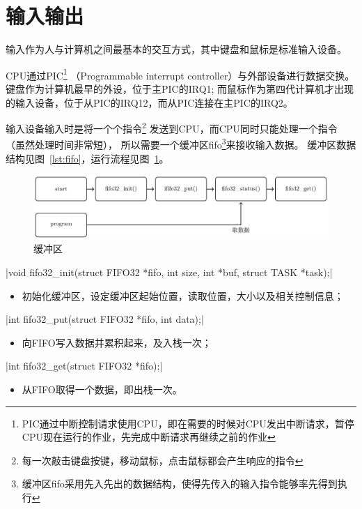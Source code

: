 \section{输入输出}
输入作为人与计算机之间最基本的交互方式，其中键盘和鼠标是标准输入设备。

CPU通过PIC\footnote{PIC通过中断控制请求使用CPU，即在需要的时候对CPU发出中断请求，暂停CPU现在运行的作业，先完成中断请求再继续之前的作业}
（Programmable interrupt controller）与外部设备进行数据交换。
键盘作为计算机最早的外设，位于主PIC的IRQ1;
而鼠标作为第四代计算机才出现的输入设备，位于从PIC的IRQ12，而从PIC连接在主PIC的IRQ2。

输入设备输入时是将一个个指令\footnote{每一次敲击键盘按键，移动鼠标，点击鼠标都会产生响应的指令}
发送到CPU，而CPU同时只能处理一个指令（虽然处理时间非常短），
所以需要一个缓冲区fifo\footnote{缓冲区fifo采用先入先出的数据结构，使得先传入的输入指令能够率先得到执行}来接收输入数据。
缓冲区数据结构见图~\ref{lst:fifo}，运行流程见图~\ref{fig:fifo}。

\begin{figure}[H]
    \centering
    \includegraphics[width=\textwidth]{../Fig/func/fifo.pdf}
    \caption{缓冲区}
    \label{fig:fifo}
\end{figure}

\csingle|void fifo32_init(struct FIFO32 *fifo, int size, int *buf, struct TASK *task);|
\begin{itemize}
  \item 初始化缓冲区，设定缓冲区起始位置，读取位置，大小以及相关控制信息；
\end{itemize}

\csingle|int fifo32_put(struct FIFO32 *fifo, int data);|
\begin{itemize}
  \item 向FIFO写入数据并累积起来，及入栈一次；
\end{itemize}

\csingle|int fifo32_get(struct FIFO32 *fifo);|
\begin{itemize}
  \item 从FIFO取得一个数据，即出栈一次。\\
\end{itemize}

